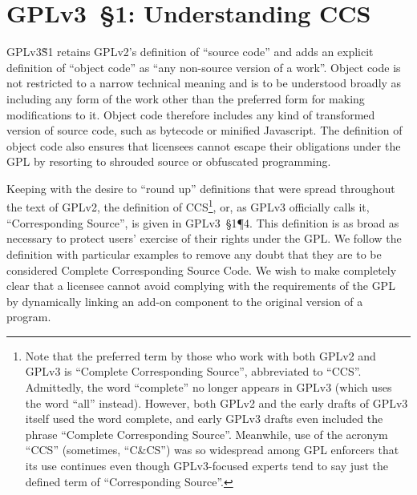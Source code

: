 \section{GPLv3~\S1: Understanding CCS}



GPLv3\~S1 retains GPLv2's definition of ``source code'' and adds an explicit
definition of ``object code'' as ``any non-source version of a work''.
Object code is not restricted to a narrow technical meaning and is to be
understood broadly as including any form of the work other than the preferred
form for making modifications to it.  Object code therefore includes any kind
of transformed version of source code, such as bytecode or minified
Javascript.  The definition of object code also ensures that licensees cannot
escape their obligations under the GPL by resorting to shrouded source or
obfuscated programming.


Keeping with the desire to ``round up'' definitions that were spread
throughout the text of GPLv2, the definition of CCS\footnote{Note that the
  preferred term by those who work with both GPLv2 and GPLv3 is ``Complete
  Corresponding Source'', abbreviated to ``CCS''.  Admittedly, the word
  ``complete'' no longer appears in GPLv3 (which uses the word ``all''
  instead).  However, both GPLv2 and the early drafts of GPLv3 itself used
  the word complete, and early GPLv3 drafts even included the phrase
  ``Complete Corresponding Source''.  Meanwhile, use of the acronym ``CCS''
  (sometimes, ``C\&CS'') was so widespread among GPL enforcers that its use
  continues even though GPLv3-focused experts tend to say just the defined
  term of ``Corresponding Source''.}, or, as GPLv3 officially calls it,
``Corresponding Source'', is given in GPLv3~\S1\P4.  This definition is as
broad as necessary to protect users' exercise of their rights under the
GPL\@.  We follow the definition with particular examples to remove any doubt
that they are to be considered Complete Corresponding Source Code.  We wish to
make completely clear that a licensee cannot avoid complying with the
requirements of the GPL by dynamically linking an add-on component to the
original version of a program.

